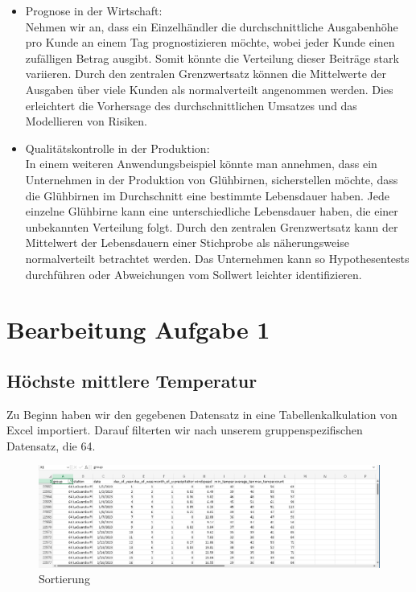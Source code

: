 \documentclass[a4paper,12pt]{article}
\begin{document}
\begin{itemize}
    \item Prognose in der Wirtschaft:\\
     Nehmen wir an, dass ein Einzelhändler die durchschnittliche Ausgabenhöhe pro Kunde an einem Tag prognostizieren möchte, wobei jeder Kunde einen zufälligen Betrag ausgibt. Somit könnte die Verteilung dieser Beiträge stark variieren. Durch den zentralen Grenzwertsatz können die Mittelwerte der Ausgaben über viele Kunden als normalverteilt angenommen werden. Dies erleichtert die Vorhersage des durchschnittlichen Umsatzes und das Modellieren von Risiken.
 \item Qualitätskontrolle in der Produktion:\\
 In einem weiteren Anwendungsbeispiel könnte man annehmen, dass ein Unternehmen in der Produktion von Glühbirnen, sicherstellen möchte, dass die Glühbirnen im Durchschnitt eine bestimmte Lebensdauer haben. Jede einzelne Glühbirne kann eine unterschiedliche Lebensdauer haben, die einer unbekannten Verteilung folgt.
Durch den zentralen Grenzwertsatz kann der Mittelwert der Lebensdauern einer Stichprobe als näherungsweise normalverteilt betrachtet werden. Das Unternehmen kann so Hypothesentests durchführen oder Abweichungen vom Sollwert leichter identifizieren.

\end{itemize}

\section{Bearbeitung Aufgabe 1}

\subsection{Höchste mittlere Temperatur}

Zu Beginn haben wir den gegebenen Datensatz in eine Tabellenkalkulation von Excel importiert. Darauf filterten wir nach unserem gruppenspezifischen Datensatz, die 64. 

\begin{figure}[h]
    \centering
    \includegraphics[width=1\linewidth]{Excel1.PNG}
    \caption{Sortierung}
    \label{fig:enter-label}
\end{figure}
\end{document}
